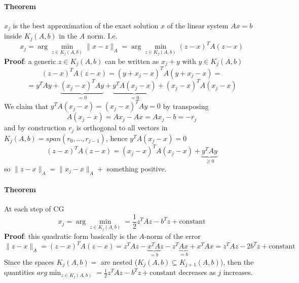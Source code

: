 \documentclass[10pt]{report}
\begin{document}
\paragraph{Theorem} $x_j$ is the best approximation of the exact solution $x$ of the linear system $Ax = b$ inside $K_j(A,b)$ in the $A$ norm. I.e.
$$x_j = \arg\min_{z\in K_j(A,b)} \|x-z\|_A = \arg\min_{z\in K_j(A,b)} (z-x)^TA(z-x)$$
\textbf{Proof}: a generic $z\in K_j(A,b)$ can be written as $x_j+y$ with $y\in K_j(A,b)$
$$(z-x)^TA(z-x) = (y+x_j-x)^TA(y+x_j-x) = $$ $$=y^TAy + \underset{=0}{\underbrace{(x_j-x)^TAy}} + \underset{=0}{\underbrace{y^TA(x_j-x)}} + (x_j-x)^TA(x_j-x)$$
We claim that $y^TA(x_j-x)= (x_j-x)^TAy = 0$ by transposing\\
$$A(x_j-x) = Ax_j - Ax = Ax_j - b = -r_j$$ and by construction $r_j$ is orthogonal to all vectors in $K_j(A,b) = span (r_0,\ldots,r_{j-1})$, hence $y^TA(x_j-x)=0$
$$(z-x)^TA(z-x) = (x_j-x)^TA(x_j-x) + \underset{\geq 0}{\underbrace{y^TAy}} $$ so $\|z-x\|_A = \|x_j-x\|_A +$ something positive.
\paragraph{Theorem} At each step of CG $$x_j = \arg\min_{z\in K_j(A,b)} = \frac{1}{2}z^TAz - b^Tz + \text{constant}$$
\textbf{Proof}: this quadratic form basically is the $A$-norm of the error
$$\|z-x\|_A = (z-x)^TA(z-x) = z^TAz - \underset{=b}{\underbrace{x^TA}}z - z^T\underset{=b}{\underbrace{Ax}} + x^TAx = z^TAz - 2b^Tz +  \text{constant}$$
Since the spaces $K_j(A,b)=$ are nested ($K_j(A,b)\subseteq K_{j+1}(A,b)$), then the quantities $arg\min_{z\in K_j(A,b)} = \frac{1}{2}z^TAz - b^Tz + \text{constant}$ decreases as $j$ increases.
\end{document}
